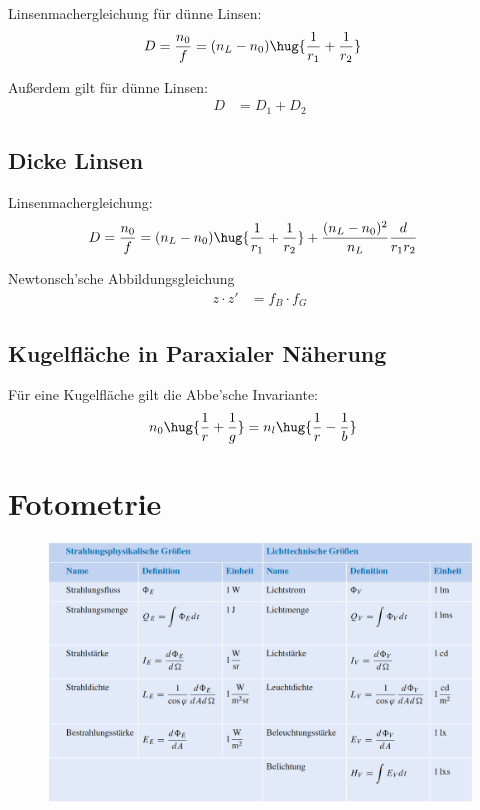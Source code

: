 \documentclass[twocolumn]{summery}
\begin{document}
Linsenmachergleichung für dünne Linsen:
\begin{align*}
    D = \frac {n_0}f &= (n_L - n_0)\hug{\frac 1{r_1} + \frac 1{r_2}}
\end{align*}

Außerdem gilt für dünne Linsen:
\begin{align*}
    D &= D_1 + D_2
\end{align*}

\subsection{Dicke Linsen}
Linsenmachergleichung:
\begin{align*}
    D = \frac {n_0}f &= (n_L - n_0)\hug{\frac 1{r_1} + \frac 1{r_2}}
    + \frac{(n_L - n_0)^2}{n_L}\frac{d}{r_1r_2}
\end{align*}

Newtonsch'sche Abbildungsgleichung
\begin{align*}
    z\cdot z' &= f_B \cdot f_G
\end{align*}

\subsection{Kugelfläche in Paraxialer Näherung}
Für eine Kugelfläche gilt die Abbe'sche Invariante:
\begin{align*}
    n_0 \hug{\frac 1r + \frac 1g} &= n_l \hug {\frac 1r - \frac 1b}
\end{align*}
 
\section{Fotometrie}
\begin{figure}[H]
    \centering
    \includegraphics[width=\textwidth]{1.png}
\end{figure}
\end{document}
